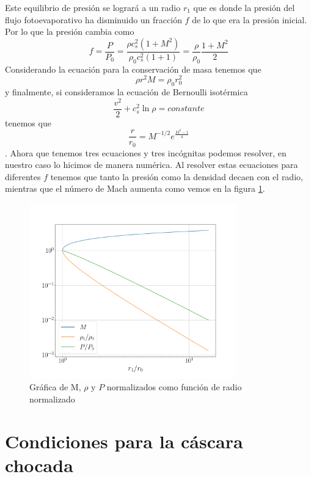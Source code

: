 \documentclass{book}
\begin{document}
Este equilibrio de presión se logrará a un radio $r_1$ que es donde la presión del flujo fotoevaporativo ha disminuido un fracción $f$ de lo que era la presión inicial. Por lo que la presión cambia como 
\begin{equation}\label{eq : 1}
f=\frac{P}{P_0}=\frac{\rho c_s^2(1+M^2)}{\rho_0 c_s^2(1+1)}=\frac{\rho}{\rho_0}\frac{1+M^2}{2}
\end{equation}
Considerando la ecuación para la conservación de masa tenemos que
\begin{equation}\label{eq : 2}
\rho r^2M	=\rho_0 r_0^2
\end{equation}
y finalmente, si consideramos la ecuación de Bernoulli isotérmica 
\[\frac{v^2}{2}+c_s^2\ln\rho=constante\]
tenemos que 
\begin{equation}\label{eq ; 3} \frac{r}{r_0}=M^{-1/2}e^{\frac{M^2-1}{4}}
\end{equation}
\citep{Dyson:1968}.
Ahora que tenemos tres ecuaciones y tres incógnitas podemos resolver, en nuestro caso lo hicimos de manera numérica. Al resolver estas ecuaciones para diferentes $f$ tenemos que tanto la presión como la densidad decaen con el radio, mientras que el número de Mach aumenta como vemos en la figura \ref{fig:grafica_C2}.

\begin{figure}[htb]
    \centering    \includegraphics[width=0.8\textwidth]{images Chapter 2/Model.pdf}
    \caption{Gráfica de M, $\rho$ y $P$ normalizados como función de radio normalizado}
    \label{fig:grafica_C2}
\end{figure}

\section{Condiciones para la cáscara chocada}
\end{document}

